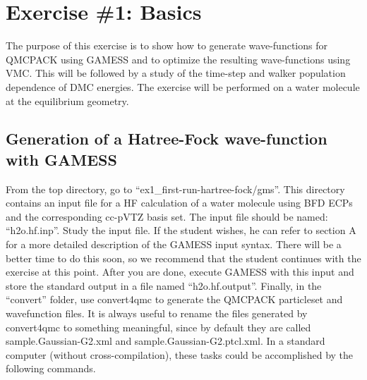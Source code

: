 \section{Exercise \#1: Basics}

The purpose of this exercise is to show how to generate wave-functions for QMCPACK
using GAMESS and to optimize the resulting wave-functions using VMC. This will be
followed by a study of the time-step and walker population dependence of DMC energies.
The exercise will be performed on a water molecule at the equilibrium geometry.


\subsection{Generation of a Hatree-Fock wave-function with GAMESS}

From the top directory, go to ``ex1\_first-run-hartree-fock/gms''. This directory contains an input
file for a HF calculation of a water molecule using BFD ECPs and the corresponding
cc-pVTZ basis set. The input file should be named: “h2o.hf.inp”. Study the input
file. If the student wishes, he can refer to section A for a more detailed description of the
GAMESS input syntax. There will be a better time to do this soon, so we recommend
that the student continues with the exercise at this point. After you are done, execute
GAMESS with this input and store the standard output in a file named ``h2o.hf.output''.
Finally, in the ``convert'' folder, use convert4qmc to generate the QMCPACK particleset and wavefunction files. It
is always useful to rename the files generated by convert4qmc to something meaningful,
since by default they are called sample.Gaussian-G2.xml and sample.Gaussian-G2.ptcl.xml.
In a standard computer (without cross-compilation), these tasks could be accomplished by
the following commands.
\noindent

